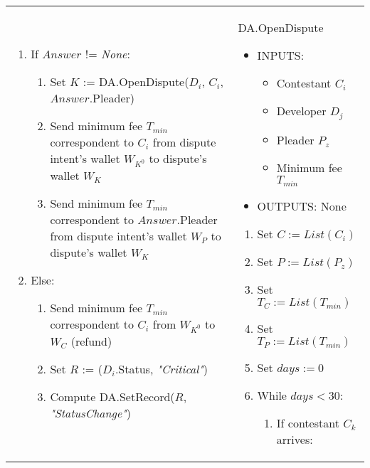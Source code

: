 \begin{table}[H]
\begin{tabular}{|p{}p{}|}
\begin{enumerate}
	\item If $Answer$ != \textit{None}:
	\begin{enumerate}
		\item Set $K$ := \textsf{DA.OpenDispute}($D_i$, $C_i$, $Answer$.Pleader)
		\item Send minimum fee $T_{min}$ correspondent to $C_i$ from dispute intent's wallet $W_{K^0}$ to dispute's wallet $W_K$
		\item Send minimum fee $T_{min}$ correspondent to $Answer$.Pleader from dispute intent's wallet $W_P$ to dispute's wallet $W_K$
	\end{enumerate}
	\item Else:
	\begin{enumerate}
		\item Send minimum fee $T_{min}$ correspondent to $C_i$ from $W_{K^0}$ to $W_C$ (refund)
		\item Set $R$ := ($D_i$.Status, \textit{"Critical"})
		\item Compute \textsf{DA.SetRecord}($R$, \textit{"StatusChange"})
	\end{enumerate}
\end{enumerate} & \vspace{0.1cm}
\textsf{DA.OpenDispute}
\vspace{-0.3cm}
\begin{itemize}
	\item INPUTS:
	\vspace{-0.4cm}
	\begin{itemize}
		\item Contestant $C_i$
		\item Developer $D_j$
		\item Pleader $P_z$
		\item Minimum fee $T_{min}$
	\end{itemize}
	\item OUTPUTS: None
\end{itemize}
\begin{enumerate}
	\item Set $C := List(C_i)$
	\item Set $P := List(P_z)$
	\item Set $T_C := List(T_{min})$
	\item Set $T_P := List(T_{min})$
	\item Set $days := 0$
	\item While $days < 30$:
	\begin{enumerate}
		\item If contestant $C_k$ arrives:

\end{enumerate}
\end{enumerate}
\end{tabular}
\end{table}
